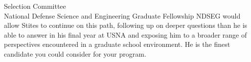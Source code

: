 \documentclass[10pt]{wrceletter}
\begin{document}
\begin{letter}{%
Selection Committee\\
National Defense Science and Engineering Graduate Fellowship}
NDSEG would allow Stites to continue on this path, following up on deeper questions than he is able to answer in his final year at USNA and exposing him to a broader range of perspectives encountered in a graduate school environment. He is the finest candidate you could consider for your program. 

\closing{~} %

\end{letter}
\end{document}
